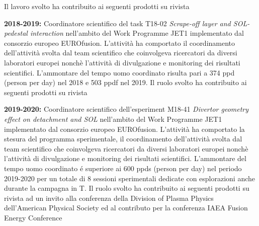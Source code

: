 \begin{enumerate}[label={[E\arabic*]}]
  Il lavoro svolto ha contribuito ai seguenti
  prodotti 
  su rivista \cite{agostini:ppcf2019, vianello:nf2019}
%
\item \textbf{2018-2019:} Coordinatore scientifico del task T18-02
  \emph{Scrape-off layer and SOL- pedestal interaction } nell'ambito
  del Work Programme JET1 implementato dal consorzio europeo
  EUROfusion. L'attivit{\`a} ha comportato il coordinamento
  dell'attivit{\`a} svolta dal team scientifico che coinvolgeva
  ricercatori da diversi laboratori europei nonch{\`e} l'attivit{\`a}
  di divulgazione e monitoring dei risultati scientifici. L'ammontare
  del tempo uomo coordinato risulta pari a 374 ppd (person per day)
  nel 2018 e 503 ppdf nel 2019. Il ruolo svolto ha contribuito ai
  seguenti prodotti su rivista \cite{tamain:nme2021, tecxy:nme2021}
%
\item \textbf{2019-2020:} Coordinatore scientifico dell'esperiment
  M18-41 \emph{Divertor geometry effect on detachment and SOL }
  nell'ambito del Work Programme JET1 implementato dal consorzio
  europeo EUROfusion. L'attivit{\`a} ha comportato la stesura del
  programma sperimentale, il coordinamento dell'attivit{\`a} svolta
  dal team scientifico che coinvolgeva ricercatori da diversi
  laboratori europei nonch{\`e} l'attivit{\`a} di divulgazione e
  monitoring dei risultati scientifici. L'ammontare del tempo uomo
  coordinato \'e superiore ai 600 ppds (person per day) nel periodo
  2019-2020 per un totale di 8 sessioni sperimentali dedicate con
  esplorazioni anche durante la campagna in T.
  Il ruolo svolto ha
  contribuito ai seguenti prodotti su rivista \cite{lomanowski:nf2022} ad un invito alla conferenza della Division of
  Plasma Physics dell'American Physical Society
  \cite{lomanowski:aps2022separatrix} ed al contributo per la
  conferenza IAEA Fusion Energy Conference \cite{vianello:iaea2021sol}
 

\end{enumerate}
